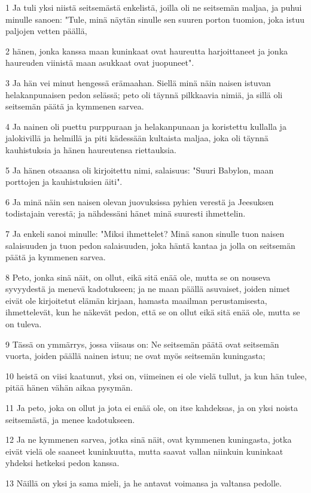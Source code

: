 \par 1 Ja tuli yksi niistä seitsemästä enkelistä, joilla oli ne seitsemän maljaa, ja puhui minulle sanoen: "Tule, minä näytän sinulle sen suuren porton tuomion, joka istuu paljojen vetten päällä,
\par 2 hänen, jonka kanssa maan kuninkaat ovat haureutta harjoittaneet ja jonka haureuden viinistä maan asukkaat ovat juopuneet".
\par 3 Ja hän vei minut hengessä erämaahan. Siellä minä näin naisen istuvan helakanpunaisen pedon selässä; peto oli täynnä pilkkaavia nimiä, ja sillä oli seitsemän päätä ja kymmenen sarvea.
\par 4 Ja nainen oli puettu purppuraan ja helakanpunaan ja koristettu kullalla ja jalokivillä ja helmillä ja piti kädessään kultaista maljaa, joka oli täynnä kauhistuksia ja hänen haureutensa riettauksia.
\par 5 Ja hänen otsaansa oli kirjoitettu nimi, salaisuus: "Suuri Babylon, maan porttojen ja kauhistuksien äiti".
\par 6 Ja minä näin sen naisen olevan juovuksissa pyhien verestä ja Jeesuksen todistajain verestä; ja nähdessäni hänet minä suuresti ihmettelin.
\par 7 Ja enkeli sanoi minulle: "Miksi ihmettelet? Minä sanon sinulle tuon naisen salaisuuden ja tuon pedon salaisuuden, joka häntä kantaa ja jolla on seitsemän päätä ja kymmenen sarvea.
\par 8 Peto, jonka sinä näit, on ollut, eikä sitä enää ole, mutta se on nouseva syvyydestä ja menevä kadotukseen; ja ne maan päällä asuvaiset, joiden nimet eivät ole kirjoitetut elämän kirjaan, hamasta maailman perustamisesta, ihmettelevät, kun he näkevät pedon, että se on ollut eikä sitä enää ole, mutta se on tuleva.
\par 9 Tässä on ymmärrys, jossa viisaus on: Ne seitsemän päätä ovat seitsemän vuorta, joiden päällä nainen istuu; ne ovat myös seitsemän kuningasta;
\par 10 heistä on viisi kaatunut, yksi on, viimeinen ei ole vielä tullut, ja kun hän tulee, pitää hänen vähän aikaa pysymän.
\par 11 Ja peto, joka on ollut ja jota ei enää ole, on itse kahdeksas, ja on yksi noista seitsemästä, ja menee kadotukseen.
\par 12 Ja ne kymmenen sarvea, jotka sinä näit, ovat kymmenen kuningasta, jotka eivät vielä ole saaneet kuninkuutta, mutta saavat vallan niinkuin kuninkaat yhdeksi hetkeksi pedon kanssa.
\par 13 Näillä on yksi ja sama mieli, ja he antavat voimansa ja valtansa pedolle.

